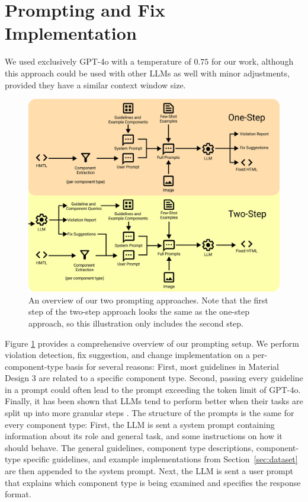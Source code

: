 \documentclass[11pt,titlepage,oneside,openany]{book}
\begin{document}
\section{Prompting and Fix Implementation}\label{sec:prompting}

We used exclusively GPT-4o with a temperature of $0.75$ for our work, although this approach could be used with other LLMs as well with minor adjustments, provided they have a similar context window size.

\begin{figure}[t]
	\centering
	\includegraphics[width=\textwidth]{figures/prompting.pdf}
	\caption{An overview of our two prompting approaches. Note that the first step of the two-step approach looks the same as the one-step approach, so this illustration only includes the second step.}
	\label{fig:prompting}
\end{figure}

Figure \ref{fig:prompting} provides a comprehensive overview of our prompting setup. We perform violation detection, fix suggestion, and change implementation on a per-component-type basis for several reasons: First, most guidelines in Material Design 3 are related to a specific component type. Second, passing every guideline in a prompt could often lead to the prompt exceeding the token limit of GPT-4o. Finally, it has been shown that LLMs tend to perform better when their tasks are split up into more granular steps \cite{khot_decomposed_2023}. The structure of the prompts is the same for every component type: First, the LLM is sent a system prompt containing information about its role and general task, and some instructions on how it should behave. The general guidelines, component type descriptions, component-type specific guidelines, and example implementations from Section~\ref{sec:dataset} are then appended to the system prompt. Next, the LLM is sent a user prompt that explains which component type is being examined and specifies the response format.
\end{document}
